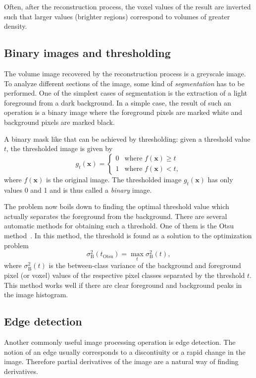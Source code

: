 \documentclass[a4paper,twoside,12pt]{article}
\begin{document}
Often, after the reconstruction process, the voxel values of the result are inverted such that larger values (brighter regions) correspond to volumes of greater density.

\subsection{Binary images and thresholding}
\label{sec:thresholding}
The volume image recovered by the reconstruction process is a greyscale image. To analyze different sections of the image, some kind of \emph{segmentation} has to be performed. One of the simplest cases of segmentation is the extraction of a light foreground from a dark background. In a simple case, the result of such an operation is a binary image where the foreground pixels are marked white and background pixels are marked black.

A binary mask like that can be achieved by thresholding: given a threshold value $t$, the thresholded image is given by
\begin{equation}
    \label{eq:threshold}
    g_t(\mathbf{x}) = \begin{cases}
        0 & \text{where } f(\mathbf{x}) \geq t \\
        1 & \text{where } f(\mathbf{x}) < t,
    \end{cases}
\end{equation}
where $f(\mathbf{x})$ is the original image. The thresholded image $g_t(\mathbf{x})$ has only values 0 and 1 and is thus called a \emph{binary} image.

The problem now boils down to finding the optimal threshold value which actually separates the foreground from the background. There are several automatic methods for obtaining such a threshold. One of them is the Otsu method~\cite{otsu}. In this method, the threshold is found as a solution to the optimization problem
\[
    \sigma_\text{B}^2(t_\text{Otsu}) = \max\limits_t \sigma_\text{B}^2(t),
\]
where $\sigma_\text{B}^2(t)$ is the between-class variance of the background and foreground pixel (or voxel) values of the respective pixel classes separated by the threshold $t$. This method works well if there are clear foreground and background peaks in the image histogram.

\subsection{Edge detection}
Another commonly useful image processing operation is edge detection. The notion of an edge usually corresponds to a discontiuity or a rapid change in the image. Therefore partial derivatives of the image are a natural way of finding derivatives.
\end{document}
